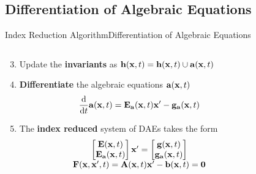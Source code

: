 \subsection{Differentiation of Algebraic Equations}

\begin{frame}{Index Reduction Algorithm}{Differentiation of Algebraic Equations}
  \vspace{-1.5em}
  \begin{columns}
    \begin{column}[c]{0.6\textwidth}
      \begin{enumerate}[<+->]\setcounter{enumi}{2}
        \item Update the \textbf{invariants} as $\mathbf{h}(\mathbf{x}, t) = \mathbf{h}(\mathbf{x}, t) \cup \mathbf{a}(\mathbf{x}, t)$
        \item \textbf{Differentiate} the algebraic equations $\mathbf{a}(\mathbf{x}, t)$
        \begin{equation*}
          \dfrac{\text{d}}{\text{d}t} \mathbf{a}(\mathbf{x}, t) = \mathbf{E}_{\mathbf{a}}(\mathbf{x}, t) \mathbf{x}^\prime - \mathbf{g}_{\mathbf{a}}(\mathbf{x}, t)
        \end{equation*}
        \item The \textbf{index reduced} system of \acsp{DAE} takes the form
        \begin{equation*}
          \begin{array}{c}
            \begin{bmatrix} \mathbf{E}(\mathbf{x}, t) \\ \mathbf{E}_{\mathbf{a}}(\mathbf{x}, t) \end{bmatrix}  \mathbf{x}^\prime =
            \begin{bmatrix} \mathbf{g}(\mathbf{x}, t) \\ \mathbf{g}_{\mathbf{a}}(\mathbf{x}, t) \end{bmatrix} \\[0.5em]
            \mathbf{F}(\mathbf{x}, \mathbf{x}^\prime, t) = \mathbf{A}(\mathbf{x}, t) \mathbf{x}^\prime - \mathbf{b}(\mathbf{x}, t) = \mathbf{0}
            \end{array}
        \end{equation*}
      \end{enumerate}
    \end{column}
    \begin{column}[c]{0.4\textwidth}
    \end{column}
  \end{columns}
\end{frame}

